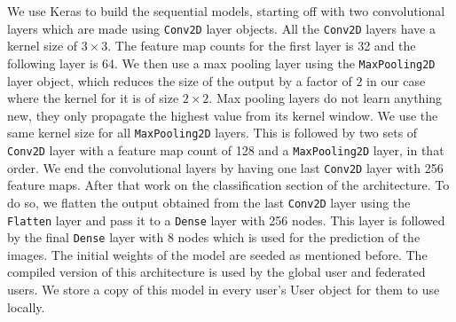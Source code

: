 \documentclass[12pt]{article}
\begin{document}
\noindent We use Keras to build the sequential models, starting off with two convolutional layers which are made using \texttt{Conv2D} layer objects. All the \texttt{Conv2D} layers have a kernel size of $3 \times 3$. The feature map counts for the first layer is 32 and the following layer is 64. We then use a max pooling layer using the \texttt{MaxPooling2D} layer object, which reduces the size of the output by a factor of $2$ in our case where the kernel for it is of size $2 \times 2$. Max pooling layers do not learn anything new, they only propagate the highest value from its kernel window. We use the same kernel size for all \texttt{MaxPooling2D} layers. This is followed by two sets of \texttt{Conv2D} layer with a feature map count of 128 and a \texttt{MaxPooling2D} layer, in that order. We end the convolutional layers by having one last \texttt{Conv2D} layer with 256 feature maps. After that work on the classification section of the architecture. To do so, we flatten the output obtained from the last \texttt{Conv2D} layer using the \texttt{Flatten} layer and pass it to a \texttt{Dense} layer with 256 nodes. This layer is followed by the final \texttt{Dense} layer with 8 nodes which is used for the prediction of the images. The initial weights of the model are seeded as mentioned before. The compiled version of this architecture is used by the global user and federated users. We store a copy of this model in every user's User object for them to use locally. 
\end{document}
